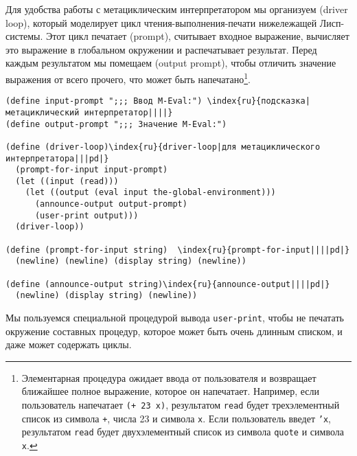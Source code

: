 Для удобства работы с
метациклическим интерпретатором мы организуем 
 (driver loop),
который моделирует цикл чтения-выполнения-печати нижележащей
Лисп-системы.  Этот цикл печатает 
 (prompt), считывает входное выражение,
вычисляет это выражение в глобальном окружении и распечатывает
результат.  Перед каждым результатом мы помещаем 
 (output prompt), чтобы 
отличить значение выражения от всего прочего, что может быть
напечатано\footnote{Элементарная процедура   ожидает ввода от пользователя и возвращает 
ближайшее полное выражение, которое он
напечатает.  Например, если пользователь напечатает {\tt (+ 23
x)}, результатом {\tt read} будет трехэлементный список
из символа {\tt +}, числа 23 и символа {\tt x}.  Если
пользователь введет {\tt 'x}, результатом {\tt read}
будет двухэлементный список из символа {\tt quote} и символа
{\tt x}. 
}.

\begin{Verbatim}[fontsize=\small]
(define input-prompt ";;; Ввод M-Eval:") \index{ru}{подсказка|метациклический интерпретатор||||}
(define output-prompt ";;; Значение M-Eval:")

(define (driver-loop)\index{ru}{driver-loop|для метациклического интерпретатора|||pd|}
  (prompt-for-input input-prompt)
  (let ((input (read)))
    (let ((output (eval input the-global-environment)))
      (announce-output output-prompt)
      (user-print output)))
  (driver-loop))

(define (prompt-for-input string)  \index{ru}{prompt-for-input||||pd|}
  (newline) (newline) (display string) (newline))

(define (announce-output string)\index{ru}{announce-output||||pd|}
  (newline) (display string) (newline))
\end{Verbatim}
Мы пользуемся специальной процедурой вывода {\tt user-print},
чтобы не печатать окружение составных процедур, которое может быть
очень длинным списком, и даже может содержать циклы.

